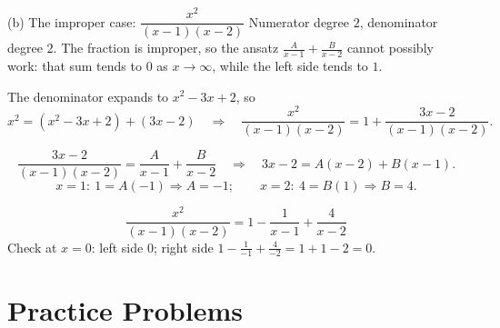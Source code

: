 \begin{worked}{(b) The improper case: $\dfrac{x^{2}}{(x-1)(x-2)}$}
Numerator degree $2$, denominator degree $2$. The fraction is improper, so
the ansatz $\frac{A}{x-1}+\frac{B}{x-2}$ cannot possibly work: that sum
tends to $0$ as $x\to\infty$, while the left side tends to $1$.

The denominator expands to $x^{2}-3x+2$, so
\[
  x^{2}=(x^{2}-3x+2)+(3x-2)
  \quad\Longrightarrow\quad
  \frac{x^{2}}{(x-1)(x-2)}=1+\frac{3x-2}{(x-1)(x-2)} .
\]

\[
  \frac{3x-2}{(x-1)(x-2)}=\frac{A}{x-1}+\frac{B}{x-2}
  \quad\Longrightarrow\quad
  3x-2=A(x-2)+B(x-1).
\]
\[
  x=1:\ 1=A(-1)\Rightarrow A=-1 ;\qquad
  x=2:\ 4=B(1)\Rightarrow B=4 .
\]

\[
  \frac{x^{2}}{(x-1)(x-2)}=\boxed{1-\frac{1}{x-1}+\frac{4}{x-2}}
\]
Check at $x=0$: left side $0$; right side $1-\frac{1}{-1}+\frac{4}{-2}
=1+1-2=0$. \checkmark
{}
\end{worked}

\section{Practice Problems}

